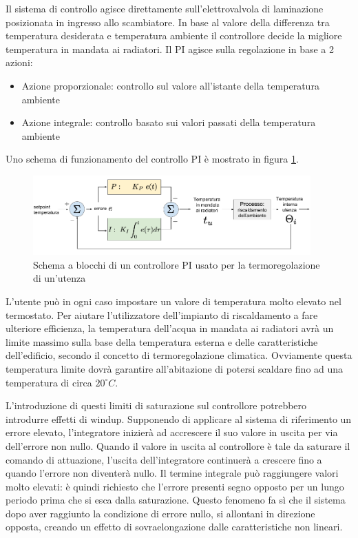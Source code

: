 \documentclass[laurea,oneside,11pt]{USiena_tesiLM}
\begin{document}
Il sistema di controllo agisce direttamente sull'elettrovalvola di laminazione posizionata in ingresso allo scambiatore. In base al valore della differenza tra temperatura desiderata e temperatura ambiente il controllore decide la migliore temperatura in mandata ai radiatori. Il PI agisce sulla regolazione in base a 2 azioni:
\begin{itemize}
\item Azione proporzionale: controllo sul valore all'istante della temperatura ambiente
\item  Azione integrale: controllo basato sui valori passati della temperatura ambiente
\end{itemize}
Uno schema di funzionamento del controllo PI è mostrato in figura \ref{fig:PI}.

\begin{figure}[!ht]
\centering
\includegraphics[width=0.95\textwidth]{figure/PI} 
\caption{Schema a blocchi di un controllore PI usato per la termoregolazione di un'utenza}
\label{fig:PI}
\end{figure}
   
L'utente può in ogni caso impostare un valore di temperatura molto elevato nel termostato. Per aiutare l'utilizzatore dell'impianto di riscaldamento a fare ulteriore efficienza, la temperatura dell'acqua in mandata ai radiatori avrà un limite massimo sulla base della temperatura esterna e delle caratteristiche dell'edificio, secondo il concetto di termoregolazione climatica. 
Ovviamente questa temperatura limite dovrà garantire all'abitazione di potersi scaldare fino ad una temperatura di circa $20 ^{\circ}C$.

L'introduzione di questi limiti di saturazione sul controllore potrebbero introdurre effetti di windup.
Supponendo di applicare al sistema di riferimento un errore elevato, l'integratore inizierà ad accrescere il suo valore in uscita per via dell'errore non nullo. Quando il valore in uscita al controllore è tale da saturare il comando di attuazione, l'uscita dell'integratore continuerà a crescere fino a quando l'errore non diventerà nullo.
Il termine integrale può raggiungere valori molto elevati: è quindi richiesto che l'errore presenti segno opposto per un lungo periodo prima che si esca dalla saturazione. 
Questo fenomeno fa sì che il sistema dopo aver raggiunto la condizione di errore nullo, si allontani in direzione opposta, creando un effetto di sovraelongazione dalle caratteristiche non lineari.\\
\end{document}
